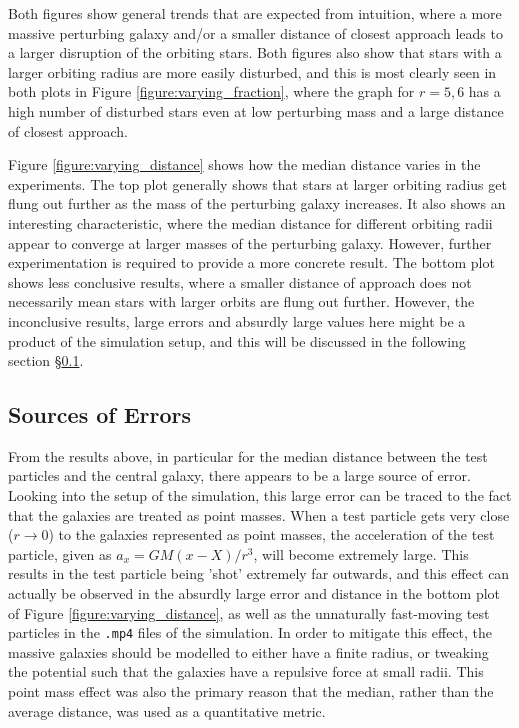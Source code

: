 \documentclass[twoside,twocolumn]{article}
\begin{document}
        Both figures show general trends that are expected from intuition, where a more massive perturbing galaxy and/or a smaller distance of closest approach leads to a larger disruption of the orbiting stars. Both figures also show that stars with a larger orbiting radius are more easily disturbed, and this is most clearly seen in both plots in Figure \ref{figure:varying_fraction}, where the graph for $r = 5, 6$ has a high number of disturbed stars even at low perturbing mass and a large distance of closest approach. 
        
        Figure \ref{figure:varying_distance} shows how the median distance varies in the experiments. The top plot generally shows that stars at larger orbiting radius get flung out further as the mass of the perturbing galaxy increases. It also shows an interesting characteristic, where the median distance for different orbiting radii appear to converge at larger masses of the perturbing galaxy. However, further experimentation is required to provide a more concrete result. The bottom plot shows less conclusive results, where a smaller distance of approach does not necessarily mean stars with larger orbits are flung out further. However, the inconclusive results, large errors and absurdly large values here might be a product of the simulation setup, and this will be discussed in the following section \S \ref{section:error}.  
        
         
    \subsection{Sources of Errors}
        \label{section:error}

        From the results above, in particular for the median distance between the test particles and the central galaxy, there appears to be a large source of error. Looking into the setup of the simulation, this large error can be traced to the fact that the galaxies are treated as point masses. When a test particle gets very close ($r \to 0$) to the galaxies represented as point masses, the acceleration of the test particle, given as $a_{x} = GM(x - X) / r^3$, will become extremely large. This results in the test particle being 'shot' extremely far outwards, and this effect can actually be observed in the absurdly large error and distance in the bottom plot of Figure \ref{figure:varying_distance}, as well as the unnaturally fast-moving test particles in the \texttt{.mp4} files of the simulation. In order to mitigate this effect, the massive galaxies should be modelled to either have a finite radius, or tweaking the potential such that the galaxies have a repulsive force at small radii. This point mass effect was also the primary reason that the median, rather than the average distance, was used as a quantitative metric. 
\end{document}
